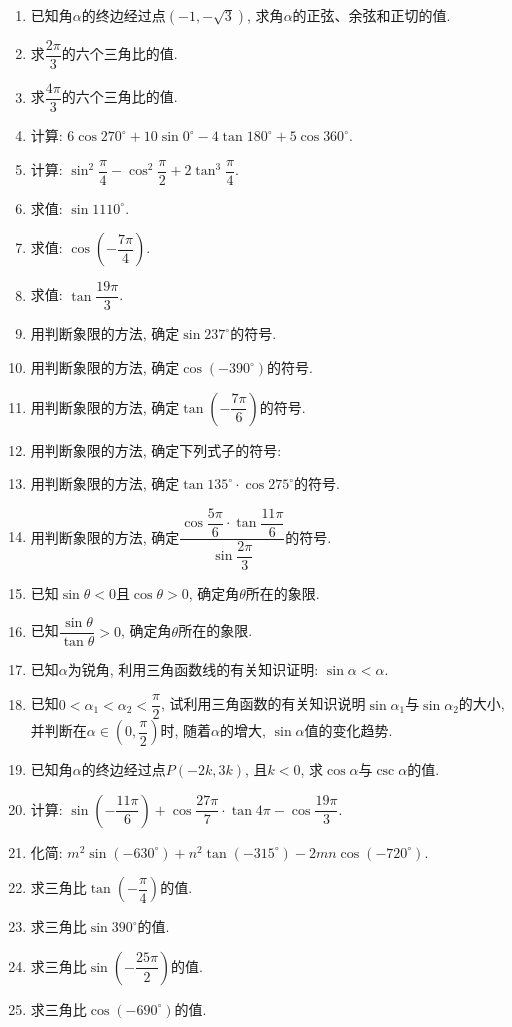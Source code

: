 \documentclass[10pt,a4paper]{article}
\begin{document}
\begin{enumerate}[1.]
\item 已知角$\alpha$的终边经过点$(-1,-\sqrt 3)$, 求角$\alpha$的正弦、余弦和正切的值.
\item 求$\dfrac{2\pi}3$的六个三角比的值.
\item 求$\dfrac{4\pi}3$的六个三角比的值.
\item 计算: $6\cos 270^\circ+10\sin 0^\circ-4\tan 180^\circ+5\cos 360^\circ$.
\item 计算: $\sin ^2\dfrac{\pi}4-\cos ^2\dfrac{\pi}2+2\tan ^3\dfrac{\pi}4$.
\item 求值: $\sin 1110^\circ$.
\item 求值: $\cos (-\dfrac{7\pi}4)$.
\item 求值: $\tan \dfrac{19\pi}3$.
\item 用判断象限的方法, 确定$\sin 237^\circ$的符号.
\item 用判断象限的方法, 确定$\cos (-390^\circ)$的符号.
\item 用判断象限的方法, 确定$\tan (-\dfrac{7\pi}6)$的符号.
\item 用判断象限的方法, 确定下列式子的符号:
\item 用判断象限的方法, 确定$\tan 135^\circ\cdot \cos 275^\circ$的符号.
\item 用判断象限的方法, 确定$\dfrac{\cos \dfrac{5\pi}6\cdot \tan \dfrac{11\pi}6}{\sin \dfrac{2\pi}3}$的符号.
\item 已知$\sin \theta <0$且$\cos \theta >0$, 确定角$\theta$所在的象限.
\item 已知$\dfrac{\sin \theta}{\tan \theta}>0$, 确定角$\theta$所在的象限.
\item 已知$\alpha$为锐角, 利用三角函数线的有关知识证明: $\sin \alpha <\alpha$.
\item 已知$0<\alpha _1<\alpha _2<\dfrac{\pi}2$, 试利用三角函数的有关知识说明$\sin \alpha _1$与$\sin \alpha _2$的大小, 并判断在$\alpha \in (0,\dfrac{\pi}2)$时, 随着$\alpha$的增大, $\sin \alpha$值的变化趋势.
\item 已知角$\alpha$的终边经过点$P(-2k,3k)$, 且$k<0$, 求$\cos \alpha$与$\csc \alpha$的值.
\item 计算: $\sin (-\dfrac{11\pi}6)+\cos \dfrac{27\pi}7\cdot \tan 4\pi -\cos \dfrac{19\pi}3$.
\item 化简: $m^2\sin (-630^\circ)+n^2\tan (-315^\circ)-2mn\cos (-720^\circ)$.
\item 求三角比$\tan (-\dfrac{\pi}4)$的值.
\item 求三角比$\sin 390^\circ$的值.
\item 求三角比$\sin (-\dfrac{25\pi}2)$的值.
\item 求三角比$\cos (-690^\circ)$的值.

\end{enumerate}
\end{document}
